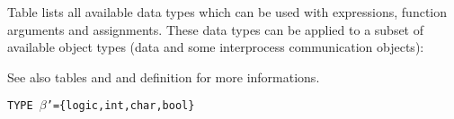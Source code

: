 \documentclass[a4paper,12pt,twoside,english]{article}
\begin{document}
\def\thesubsubsection{\tocXXII}
\secIII{\label{toclabelXXII}\thesubsubsection}
Table  lists all available data types which can be used with expressions, function
arguments and assignments. These data types can be applied to a subset of available object types (data and some interprocess communication objects): 


\vskip5pt
See also tables  and  and definition  for more informations.


\vskip5pt

\begin{description}
\itemindent-10pt
\parskip-2pt

\item[Data Types] {\tt TYPE }{\tt $\beta$}{\tt '=\{}{\tt logic,int,char,bool\}}


\end{description}

\vskip5pt
\end{document}
